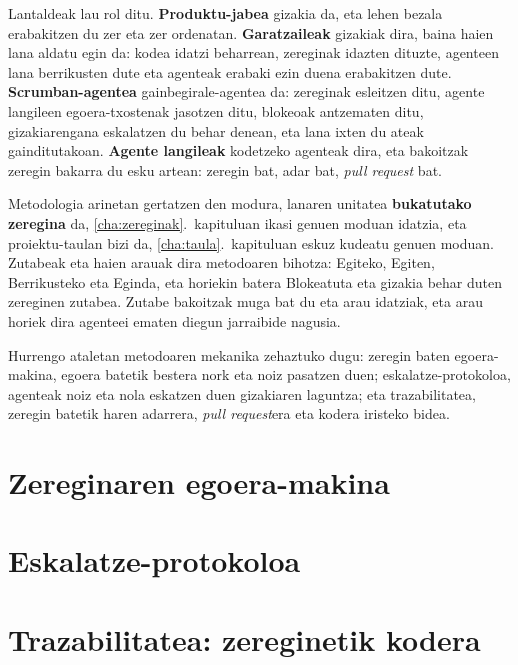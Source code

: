 Lantaldeak lau rol ditu.
\textbf{Produktu-jabea} gizakia da, eta lehen bezala erabakitzen du zer eta zer ordenatan.
\textbf{Garatzaileak} gizakiak dira, baina haien lana aldatu egin da: kodea idatzi beharrean, zereginak idazten dituzte, agenteen lana berrikusten dute eta agenteak erabaki ezin duena erabakitzen dute.
\textbf{Scrumban-agentea} gainbegirale-agentea da: zereginak esleitzen ditu, agente langileen egoera-txostenak jasotzen ditu, blokeoak antzematen ditu, gizakiarengana eskalatzen du behar denean, eta lana ixten du ateak gainditutakoan.
\textbf{Agente langileak} kodetzeko agenteak dira, eta bakoitzak zeregin bakarra du esku artean: zeregin bat, adar bat, \textit{pull request} bat.

Metodologia arinetan gertatzen den modura, lanaren unitatea \textbf{bukatutako zeregina} da, \ref{cha:zereginak}.~kapituluan ikasi genuen moduan idatzia, eta proiektu-taulan bizi da, \ref{cha:taula}.~kapituluan eskuz kudeatu genuen moduan.
Zutabeak eta haien arauak dira metodoaren bihotza: Egiteko, Egiten, Berrikusteko eta Eginda, eta horiekin batera Blokeatuta eta gizakia behar duten zereginen zutabea.
Zutabe bakoitzak muga bat du eta arau idatziak, eta arau horiek dira agenteei ematen diegun jarraibide nagusia.

Hurrengo ataletan metodoaren mekanika zehaztuko dugu: zeregin baten egoera-makina, egoera batetik bestera nork eta noiz pasatzen duen; eskalatze-protokoloa, agenteak noiz eta nola eskatzen duen gizakiaren laguntza; eta trazabilitatea, zeregin batetik haren adarrera, \textit{pull request}era eta kodera iristeko bidea.

\section{Zereginaren egoera-makina}

\section{Eskalatze-protokoloa}

\section{Trazabilitatea: zereginetik kodera}
